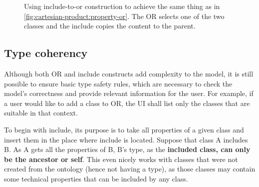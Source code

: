 \begin{figure}[h!]\centering
  \centering
  \caption{Using include-to-or construction to achieve the same thing as in \autoref{fig:cartesian-product:property-or}. The OR selects one of the two classes and the include copies the content to the parent.}
  \label{fig:cartesian-product:include-to-or}
\end{figure}

\subsection{Type coherency}\label{sec:type-coherency}

Although both OR and include constructs add complexity to the model, it is still possible to ensure basic type safety rules, which are necessary to check the model's correctness and provide relevant information for the user. For example, if a user would like to add a class to OR, the UI shall list only the classes that are suitable in that context.

\bigskip

To begin with include, its purpose is to take all properties of a given class and insert them in the place where include is located. Suppose that class A includes B. As A gets all the properties of B, B's type, as the \textbf{included class, can only be the ancestor or self}. This even nicely works with classes that were not created from the ontology (hence not having a type), as those classes may contain some technical properties that can be included by any class.

